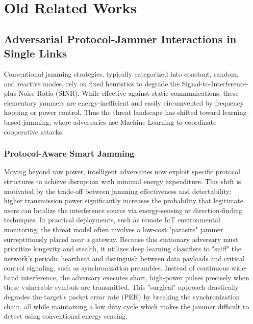 \documentclass[journal]{IEEEtran}
\newcommand{\adm}[1]{{\color{orange}{[#1]}}}
\begin{document}
\section{Old Related Works}
\subsection{Adversarial Protocol-Jammer Interactions in Single Links}
Conventional jamming strategies, typically categorized into constant, random, and reactive modes, rely on fixed heuristics to degrade the Signal-to-Interference-plus-Noise Ratio (SINR). 
While effective against static communications, these elementary jammers are energy-inefficient and easily circumvented by frequency hopping or power control. 
Thus the threat landscape has shifted toward learning-based jamming, where adversaries use Machine Learning to coordinate cooperative attacks.~\cite{jamming_survey_2024}

\subsubsection{Protocol-Aware Smart Jamming}
Moving beyond raw power, intelligent adversaries now exploit specific protocol structures to achieve disruption with minimal energy expenditure.
This shift is motivated by the trade-off between jamming effectiveness and detectability: higher transmission power significantly increases the probability that legitimate users can localize the interference source via energy-sensing or direction-finding techniques. 
In practical deployments, such as remote IoT environmental monitoring, the threat model often involves a low-cost "parasite" jammer surreptitiously placed near a gateway.
Because this stationary adversary must prioritize longevity and stealth, it utilizes deep learning classifiers to "sniff" the network’s periodic heartbeat and distinguish between data payloads and critical control signaling, such as synchronization preambles.
Instead of continuous wide-band interference, the adversary executes short, high-power pulses precisely when these vulnerable symbols are transmitted. 
This "surgical" approach drastically degrades the target's packet error rate (PER) by breaking the synchronization chain, all while maintaining a low duty cycle which makes the jammer difficult to detect using conventional energy sensing.
\end{document}
